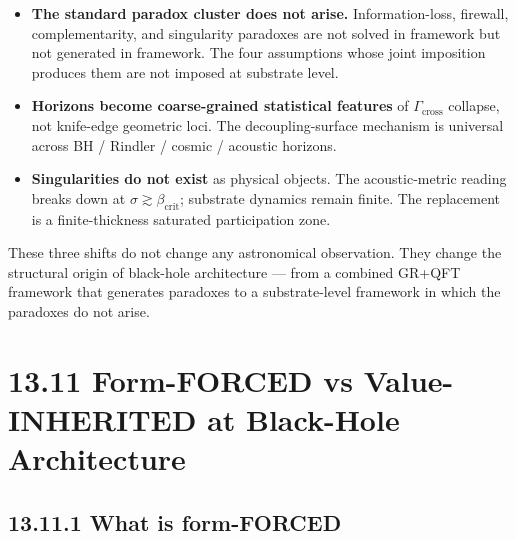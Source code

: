\documentclass[11pt]{book}
\begin{document}
\begin{itemize}
\item \textbf{The standard paradox cluster does not arise.} Information-loss, firewall, complementarity, and singularity paradoxes are not solved in framework but not generated in framework. The four assumptions whose joint imposition produces them are not imposed at substrate level.
\item \textbf{Horizons become coarse-grained statistical features} of $\Gamma_\mathrm{cross}$ collapse, not knife-edge geometric loci. The decoupling-surface mechanism is universal across BH / Rindler / cosmic / acoustic horizons.
\item \textbf{Singularities do not exist} as physical objects. The acoustic-metric reading breaks down at $\sigma \gtrsim \beta_\mathrm{crit}$; substrate dynamics remain finite. The replacement is a finite-thickness saturated participation zone.
\end{itemize}

These three shifts do not change any astronomical observation. They change the structural origin of black-hole architecture — from a combined GR+QFT framework that generates paradoxes to a substrate-level framework in which the paradoxes do not arise.

\section{13.11 Form-FORCED vs Value-INHERITED at Black-Hole Architecture}

\subsection{13.11.1 What is form-FORCED}
\end{document}
